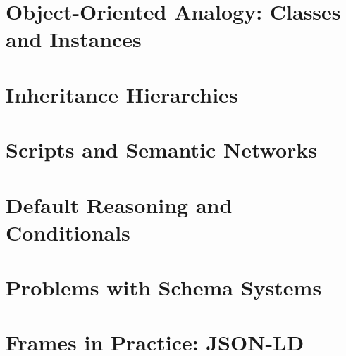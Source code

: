 

\section{Object-Oriented Analogy: Classes and Instances} %


\section{Inheritance Hierarchies} %


\section{Scripts and Semantic Networks} %


\section{Default Reasoning and Conditionals} %


\section{Problems with Schema Systems} %


\section{Frames in Practice: JSON-LD} %

